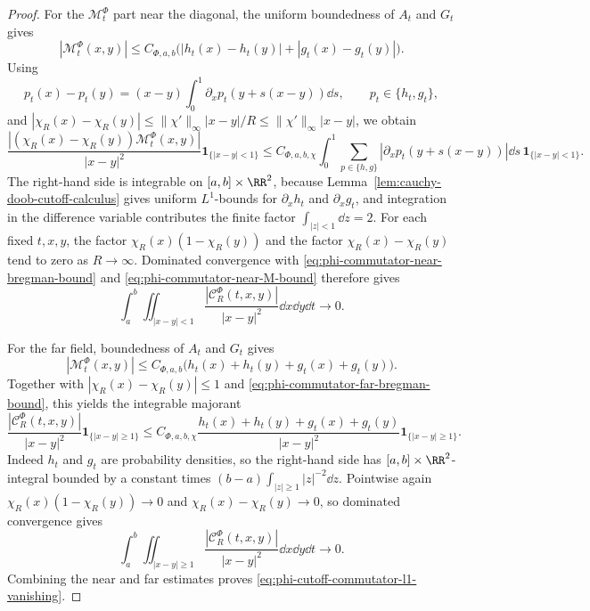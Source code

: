 \begin{proof}
For the \(\mathcal M_t^\Phi\) part near the diagonal, the uniform boundedness
of \(A_t\) and \(G_t\) gives
\[
|\mathcal M_t^\Phi(x,y)|
\le C_{\Phi,a,b}\bigl(|h_t(x)-h_t(y)|+|g_t(x)-g_t(y)|\bigr).
\]
Using
\[
p_t(x)-p_t(y)
=(x-y)\int_0^1\partial_xp_t(y+s(x-y))\dd s,
\qquad p_t\in\{h_t,g_t\},
\]
and
\(|\chi_R(x)-\chi_R(y)|
\le \|\chi'\|_\infty |x-y|/R\le \|\chi'\|_\infty |x-y|\), we obtain
\begin{equation}\label{eq:phi-commutator-near-M-bound}
\frac{|(\chi_R(x)-\chi_R(y))\mathcal M_t^\Phi(x,y)|}{|x-y|^2}
\mathbf 1_{\{|x-y|<1\}}
\le
C_{\Phi,a,b,\chi}\int_0^1
\sum_{p\in\{h,g\}}|\partial_xp_t(y+s(x-y))|\dd s\,
\mathbf 1_{\{|x-y|<1\}} .
\end{equation}
The right-hand side is integrable on \([a,b]\times\RR^2\), because
Lemma~\ref{lem:cauchy-doob-cutoff-calculus} gives uniform \(L^1\)-bounds for
\(\partial_xh_t\) and \(\partial_xg_t\), and integration in the difference
variable contributes the finite factor \(\int_{|z|<1}\dd z=2\).
For each fixed \(t,x,y\), the factor
\(\chi_R(x)(1-\chi_R(y))\) and the factor
\(\chi_R(x)-\chi_R(y)\) tend to zero as \(R\to\infty\).  Dominated
convergence with
\eqref{eq:phi-commutator-near-bregman-bound} and
\eqref{eq:phi-commutator-near-M-bound} therefore gives
\[
\int_a^b\iint_{|x-y|<1}
\frac{|\mathcal C_R^\Phi(t,x,y)|}{|x-y|^2}
\dd x\dd y\dd t\longrightarrow0 .
\]

For the far field, boundedness of \(A_t\) and \(G_t\) gives
\[
|\mathcal M_t^\Phi(x,y)|
\le C_{\Phi,a,b}\bigl(h_t(x)+h_t(y)+g_t(x)+g_t(y)\bigr).
\]
Together with \(|\chi_R(x)-\chi_R(y)|\le1\) and
\eqref{eq:phi-commutator-far-bregman-bound}, this yields the integrable
majorant
\begin{equation}\label{eq:phi-commutator-far-M-bound}
\frac{|\mathcal C_R^\Phi(t,x,y)|}{|x-y|^2}
\mathbf 1_{\{|x-y|\ge1\}}
\le
C_{\Phi,a,b,\chi}
\frac{h_t(x)+h_t(y)+g_t(x)+g_t(y)}{|x-y|^2}
\mathbf 1_{\{|x-y|\ge1\}} .
\end{equation}
Indeed \(h_t\) and \(g_t\) are probability densities, so the right-hand side
has \([a,b]\times\RR^2\)-integral bounded by a constant times
\((b-a)\int_{|z|\ge1}|z|^{-2}\dd z\).  Pointwise again
\(\chi_R(x)(1-\chi_R(y))\to0\) and
\(\chi_R(x)-\chi_R(y)\to0\), so dominated convergence gives
\[
\int_a^b\iint_{|x-y|\ge1}
\frac{|\mathcal C_R^\Phi(t,x,y)|}{|x-y|^2}
\dd x\dd y\dd t\longrightarrow0 .
\]
Combining the near and far estimates proves
\eqref{eq:phi-cutoff-commutator-l1-vanishing}.
\end{proof}
